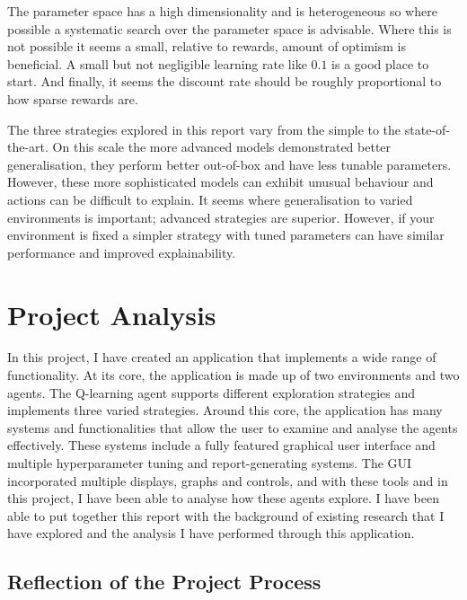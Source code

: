 \documentclass[]{final_report}
\begin{document}
The parameter space has a high dimensionality and is heterogeneous so where possible a systematic search over the parameter space is advisable. Where this is not possible it seems a small, relative to rewards, amount of optimism is beneficial. A small but not negligible learning rate like $0.1$ is a good place to start. And finally, it seems the discount rate should be roughly proportional to how sparse rewards are. 

The three strategies explored in this report vary from the simple to the state-of-the-art. On this scale the more advanced models demonstrated better generalisation, they perform better out-of-box and have less tunable parameters. However, these more sophisticated models can exhibit unusual behaviour and actions can be difficult to explain. It seems where generalisation to varied environments is important; advanced strategies are superior. However, if your environment is fixed a simpler strategy with tuned parameters can have similar performance and improved explainability.

\chapter{Project Analysis}
\label{chap:project-analysis}
In this project, I have created an application that implements a wide range of functionality. At its core, the application is made up of two environments and two agents. The Q-learning agent supports different exploration strategies and implements three varied strategies. Around this core, the application has many systems and functionalities that allow the user to examine and analyse the agents effectively. These systems include a fully featured graphical user interface and multiple hyperparameter tuning and report-generating systems. The GUI incorporated multiple displays, graphs and controls, and with these tools and in this project, I have been able to analyse how these agents explore. I have been able to put together this report with the background of existing research that I have explored and the analysis I have performed through this application. 

\section{Reflection of the Project Process}
\end{document}
